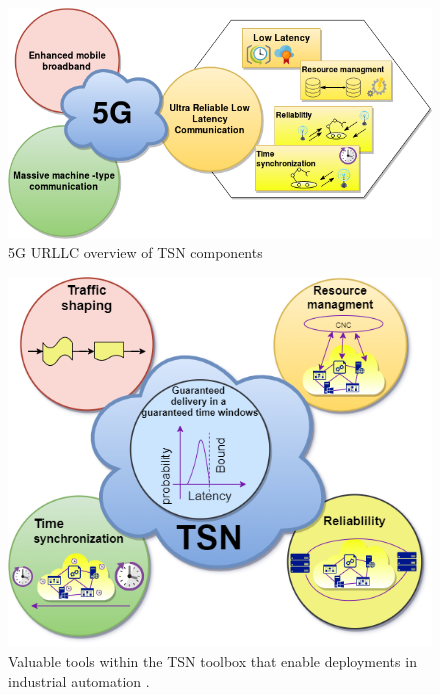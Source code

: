   \begin{figure}

\centering
\includegraphics[scale=0.45]{images/5g-tsn-etr-figure01.png}
\caption{5G URLLC overview of TSN components \cite{Ericsson2019}}
\label{fig:5G_URLLC_TSN}
\end{figure}
 
  

\begin{figure}

\centering
\includegraphics[scale=0.45]{images/TSN toolbox.png}
\caption{Valuable tools within the TSN toolbox that enable deployments in industrial automation \cite{embeddedcomputing2020}.}
\label{fig:TSN_toolbox}
\end{figure}
 

